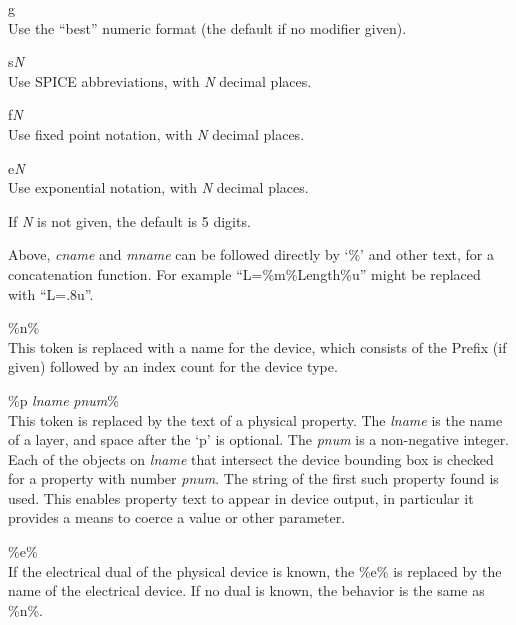 \begin{description}
\begin{description}
\begin{description}
\item{g}\\
Use the ``best'' numeric format (the default if no modifier given).

\item{s}{\it N}\\
Use SPICE abbreviations, with {\it N} decimal places.

\item{f}{\it N}\\
Use fixed point notation, with {\it N} decimal places.

\item{e}{\it N}\\
Use exponential notation, with {\it N} decimal places.

\end{description}
If {\it N} is not given, the default is 5 digits.

\end{description}
Above, {\it cname} and {\it mname} can be followed directly by
`\%' and other text, for a concatenation function.  For example
``{\vt L=\%m\%Length\%u}'' might be replaced with ``{\vt L=.8u}''.

\begin{description}
\item{\et \%n\%}\\
This token is replaced with a name for the device, which consists of
the {\et Prefix} (if given) followed by an index count for the device
type.

\item{\et \%p {\it lname} {\it pnum}\%}\\
This token is replaced by the text of a physical property.  The {\it
lname} is the name of a layer, and space after the `p' is optional. 
The {\it pnum} is a non-negative integer.  Each of the objects on {\it
lname} that intersect the device bounding box is checked for a
property with number {\it pnum\/}.  The string of the first such
property found is used.  This enables property text to appear in
device output, in particular it provides a means to coerce a value or
other parameter.

\item{\et \%e\%}\\
If the electrical dual of the physical device is known, the {\et
\%e\%} is replaced by the name of the electrical device.  If no dual
is known, the behavior is the same as {\et \%n\%}.


\end{description}
\end{description}
